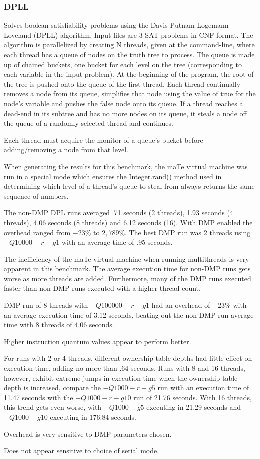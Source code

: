 \subsubsection{DPLL}

Solves boolean satisfiability problems using the
Davis-Putnam-Logemann-Loveland (DPLL) algorithm.  Input files are
3-SAT problems in CNF format.  The algorithm is parallelized by
creating N threads, given at the command-line, where each thread has a
queue of nodes on the truth tree to process.  The queue is made up of
chained buckets, one bucket for each level on the tree (corresponding
to each variable in the input problem).  At the beginning of the
program, the root of the tree is pushed onto the queue of the first
thread.  Each thread continually removes a node from its queue,
simplifies that node using the value of true for the node's variable
and pushes the false node onto its queue.  If a thread reaches a
dead-end in its subtree and has no more nodes on its queue, it steals
a node off the queue of a randomly selected thread and continues.

Each thread must acquire the monitor of a queue's bucket before
adding/removing a node from that level.

When generating the results for this benchmark, the maTe virtual
machine was run in a special mode which ensures the Integer.rand()
method used in determining which level of a thread's queue to steal
from always returns the same sequence of numbers.

The non-DMP DPL runs averaged .71 seconds (2 threads), 1.93 seconds (4
threads), 4.06 seconds (8 threads) and 6.12 seconds (16).  With DMP
enabled the overhead ranged from $-23\%$ to $2,789\%$.  The best DMP
run was 2 threads using $-Q10000 -r -g1$ with an average time of .95
seconds.

The inefficiency of the maTe virtual machine when running multithreads
is very apparent in this benchmark.  The average execution time for
non-DMP runs gets worse as more threads are added.  Furthermore, many
of the DMP runs executed faster than non-DMP runs executed with a
higher thread count.

DMP run of 8 threads with $-Q100000 -r -g1$ had an overhead of $-23\%$
with an average execution time of 3.12 seconds, beating out the
non-DMP run average time with 8 threads of 4.06 seconds.

Higher instruction quantum values appear to perform better.

For runs with 2 or 4 threads, different ownership table depths had
little effect on execution time, adding no more than .64 seconds.
Runs with 8 and 16 threads, however, exhibit extreme jumps in
execution time when the ownership table depth is increased, compare
the $-Q1000 -r -g5$ run with an execution time of 11.47 seconds with
the $-Q1000 -r -g10$ run of 21.76 seconds.  With 16 threads, this
trend gets even worse, with $-Q1000 -g5$ executing in 21.29 seconds
and $-Q1000 -g10$ executing in 176.84 seconds.

Overhead is very sensitive to DMP parameters chosen.

Does not appear sensitive to choice of serial mode.

